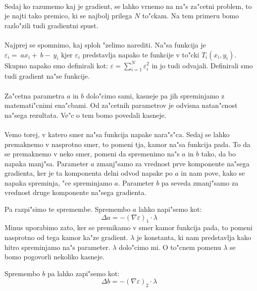 \paragraph{}
Sedaj ko razumemo kaj je gradient, se lahko vrnemo na na"s za"cetni problem, to je najti tako premico, ki se najbolj prilega $N$ to"ckam. Na tem primeru bomo razlo"zili tudi gradientni spust.

\paragraph{}
Najprej se spomnimo, kaj sploh "zelimo narediti. Na"sa funkcija je $\varepsilon_i = ~ax_i + ~b - ~y_i$ kjer $\varepsilon_i$ predstavlja napako te funkcije v to"cki $T_i(x_i, y_i)$. Skupno napako smo definirali kot: $\varepsilon = \sum_{i=1}^{N} \varepsilon_i^2$ in jo tudi odvajali. Definirali smo tudi gradient na"se funkcije.


\paragraph{}
Za"cetna parametra $a$ in $b$ dolo"cimo sami, kasneje pa jih spreminjamo z matemati"cnimi ena"cbami. Od za"cetnih parametrov je odvisna natan"cnost na"sega rezultata. Ve"c o tem bomo povedali kasneje.

\paragraph{}
Vemo torej, v katero smer na"sa funkcija napake nara"s"ca. Sedaj se lahko premaknemo v nasprotno smer, to pomeni tja, kamor na"sa funkcija pada. To da se premaknemo v neko smer, pomeni da spremenimo na"s $a$ in $b$ tako, da bo napaka manj"sa. Parameter $a$ zmanj"samo za vrednost prve komponente na"sega gradienta, ker je ta komponenta delni odvod napake po $a$ in nam pove, kako se napaka spreminja, "ce spreminjamo $a$. Parameter $b$ pa seveda zmanj"samo za vrednost druge komponente na"sega gradienta.

Pa razpi"simo te spremembe. Spremembo $a$ lahko napi"semo kot:
\[\Delta a = -(\nabla \varepsilon)_1 \cdot \lambda\]
Minus uporabimo zato, ker se premikamo v smer kamor funkcija pada, to pomeni nasprotno od tega kamor ka"ze gradient. $\lambda$ je konstanta, ki nam predstavlja kako hitro spreminjamo na"s parameter. $\lambda$ dolo"cimo mi. O to"cnem pomenu $\lambda$ se bomo pogovorli nekoliko kasneje.

Spremembo $b$ pa lahko zapi"semo kot:
\[\Delta b = -(\nabla \varepsilon)_2 \cdot \lambda\]

